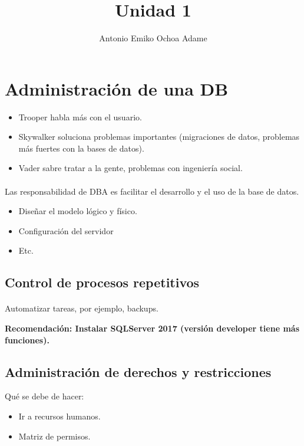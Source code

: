 \documentclass{article}
\begin{document}
\title{Unidad 1}
\author{Antonio Emiko Ochoa Adame}
\maketitle

\tableofcontents

\section{Administración de una DB}
\begin{itemize}
	\item
	Trooper habla más con el usuario.
	\item
	Skywalker soluciona problemas importantes (migraciones de datos, problemas más
	fuertes con la bases de datos).
	\item
	Vader sabre tratar a la gente, problemas con ingeniería social.
\end{itemize}

\paragraph{}
Las responsabilidad de DBA es facilitar el desarrollo y el uso de la base de datos.


\begin{itemize}
	\item
	Diseñar el modelo lógico y físico.
	\item
	Configuración del servidor
	\item
	Etc.
\end{itemize}

\subsection{Control de procesos repetitivos}

\paragraph{}
Automatizar tareas, por ejemplo, backups.

\textbf{Recomendación: Instalar SQLServer 2017 (versión developer tiene más funciones).}

\subsection{Administración de derechos y restricciones}

Qué se debe de hacer:
\begin{itemize}
	\item
	Ir a recursos humanos.
	\item
	Matriz de permisos.
\end{itemize}
\end{document}
